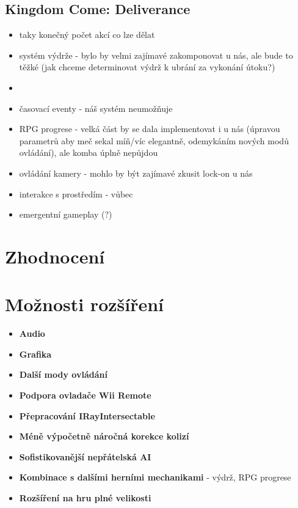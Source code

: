 \subsection{Kingdom Come: Deliverance}

\begin{itemize}
    \item taky konečný počet akcí co lze dělat
    \item systém výdrže - bylo by velmi zajímavé zakomponovat u nás, ale bude to těžké (jak chceme determinovat výdrž k ubrání za vykonání útoku?)
    \item 
    \item časovací eventy - náš systém neumožňuje
    \item RPG progrese - velká část by se dala implementovat i u nás (úpravou parametrů aby meč sekal míň/víc elegantně, odemykáním nových modů ovládání), ale komba úplně nepůjdou
    \item ovládání kamery - mohlo by být zajímavé zkusit lock-on u nás
    \item interakce s prostředím - vůbec
    \item emergentní gameplay (?) 
\end{itemize}

\section{Zhodnocení}

\section{Možnosti rozšíření}

\begin{itemize}
    \item \textbf{Audio}
    \item \textbf{Grafika}
    \item \textbf{Další mody ovládání}
    \item \textbf{Podpora ovladače Wii Remote}
    \item \textbf{Přepracování IRayIntersectable}
    \item \textbf{Méně výpočetně náročná korekce kolizí}
    \item \textbf{Sofistikovanější nepřátelská AI}
    \item \textbf{Kombinace s dalšími herními mechanikami} - výdrž, RPG progrese
    \item \textbf{Rozšíření na hru plné velikosti}
\end{itemize}